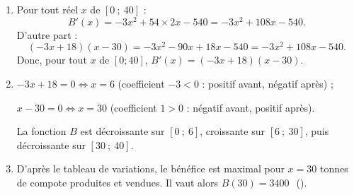 \documentclass[10pt]{article}
\providecommand{\euro}{\texteuro}
\providecommand{\np}[2][]{{#2~#1}}
\providecommand{\euro}{{\text{€}}}
\renewcommand{\euro}{\ifmmode\text{\texteuro}\else\texteuro\fi}
\begin{document}
\begin{enumerate}
	\item Pour tout réel $x$ de $[0~;~40]$ :
	\[B'(x) = -3x^2 + 54 \times 2x - 540 = -3x^2 + 108x - 540.\]
	D'autre part :
	\[(-3x+18)(x-30) = -3x^2 - 90x + 18x - 540 = -3x^2 + 108x - 540.\]
	Donc, pour tout $x$ de $[0 ; 40]$, $B'(x) = (-3x+18)(x-30)$.

	\item $-3x + 18 = 0 \iff x = 6$ (coefficient $-3 < 0$ : positif avant, négatif après) ;

	$x - 30 = 0 \iff x = 30$ (coefficient $1 > 0$ : négatif avant, positif après).

	\begin{center}
	\end{center}

La fonction $B$ est décroissante sur $[0~;~6]$, croissante sur
	$[6~;~30]$, puis décroissante sur $[30~;~40]$.

	\item D'après le tableau de variations, le bénéfice est maximal pour $x = 30$ tonnes de compote produites et vendues. Il vaut alors $B(30) = \np{3400}$~(\euro).
\end{enumerate}

\medskip
\end{document}
